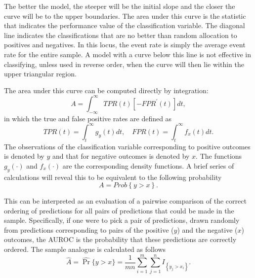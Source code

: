 

The better the model, the steeper will be the initial slope and the closer the curve will be to the upper boundaries.
The area under this curve is the statistic that indicates the performance value of the classification variable.
The diagonal line indicates the classifications that are no better than random allocation to positives and negatives.
In this locus, the event rate is simply the average event rate for the entire sample.
A model with a curve below this line is not effective in classifying, unless used in reverse order, when the curve will then lie within the upper triangular region.


The area under this curve can be computed directly by integration:
%
\begin{equation}
    A = \int_{-\infty}^{\infty} TPR(t) [-FPR^{\prime}(t)] dt,
\end{equation}
%
\noindent in which the true and false positive rates are defined as
%
\begin{equation}
    TPR(t) = \int_{t}^{\infty} g_y(t) dt, \quad FPR(t) = \int_{t}^{\infty} f_x(t) dt.
\end{equation}
%
The observations of the classification variable corresponding to positive outcomes is denoted by $y$ and that for negative outcomes is denoted by $x$. The functions $g_y(\cdot)$ and $f_x(\cdot)$ are the corresponding density functions.
%
A brief series of calculations will reveal this to be equivalent to the following probability
%
\begin{equation}
    A = Prob{\left\{ y > x \right\}}.
\end{equation}
%



This can be interpreted as an evaluation of a pairwise comparison of the correct ordering of predictions for all pairs of predictions that could be made in the sample.
%
Specifically, if one were to pick a pair of predictions, drawn randomly from predictions corresponding to pairs of the positive ($y$) and the negative ($x$) outcomes, the AUROC is the probability that these predictions are correctly ordered.
%
The sample analogue is calculated as follows
%
\begin{equation} \label{eqn:auroc}
    \hat{A} = \hat{\Pr} \{ y > x \} = \frac{1}{m n} \sum_{i = 1}^{m} \sum_{j = 1}^{n} I_{\left\{ y_j > x_i \right\}}.
\end{equation}
%

